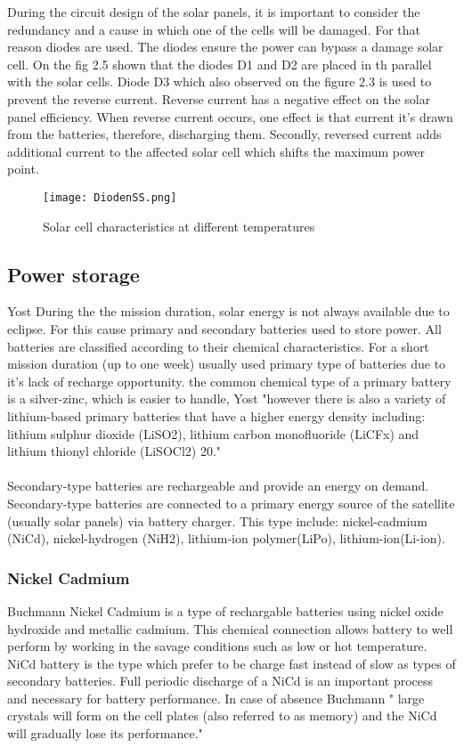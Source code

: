 During the circuit design of the solar panels, it is important to consider the redundancy and a cause in which one of the cells will be damaged. For that reason diodes are used. The diodes ensure the power can bypass a damage solar cell. On the fig 2.5 shown that the diodes D1 and D2 are placed in th parallel with the solar cells. Diode D3 which also observed on the figure 2.3 is used to prevent the reverse current. Reverse current has a negative effect on the solar panel efficiency. When reverse current occurs, one effect is that current it's drawn from the batteries, therefore, discharging them. Secondly, reversed current adds additional current to the affected solar cell which shifts the maximum power point.\\


\begin{figure}[h]
	\centering
	\texttt{[image: DiodenSS.png]}
	\caption{ Solar cell characteristics at different temperatures}
	\label{fig: EPS}
\end{figure}
 
\newpage


\subsection{Power storage \label{sec:tech1}}



Yost\cite{1} During the the mission duration, solar energy is not always available due to eclipse. For this cause primary and secondary batteries used to store power. All batteries are classified according to their chemical characteristics. For a short mission duration (up to one week) usually used primary type of batteries due to it's lack of recharge opportunity. the common chemical type of a primary battery is a silver-zinc, which is easier to handle, Yost\cite{1} "however there is also a variety of lithium-based primary batteries that have a higher energy density including: lithium sulphur dioxide (LiSO2), lithium carbon monofluoride (LiCFx) and lithium thionyl chloride (LiSOCl2) 20."\\
\\
Secondary-type batteries are rechargeable and provide an energy on demand. Secondary-type batteries are connected to a primary energy source of the satellite (usually solar panels) via battery charger. This type include: nickel-cadmium (NiCd), nickel-hydrogen (NiH2), lithium-ion polymer(LiPo), lithium-ion(Li-ion).
\subsubsection{Nickel Cadmium \label{sec:tech}}
 Buchmann\cite{7} Nickel Cadmium is a type of rechargable batteries using nickel oxide hydroxide and metallic cadmium. This chemical connection allows battery to well perform by working in the savage conditions such as low or hot temperature. NiCd battery is the type which prefer to be charge fast instead of slow as types of secondary batteries. Full periodic discharge of a NiCd is an important process and necessary for battery performance. In case of absence  Buchmann\cite{7} " large crystals will form on the cell plates (also referred to as memory) and the NiCd will gradually lose its performance."
 
